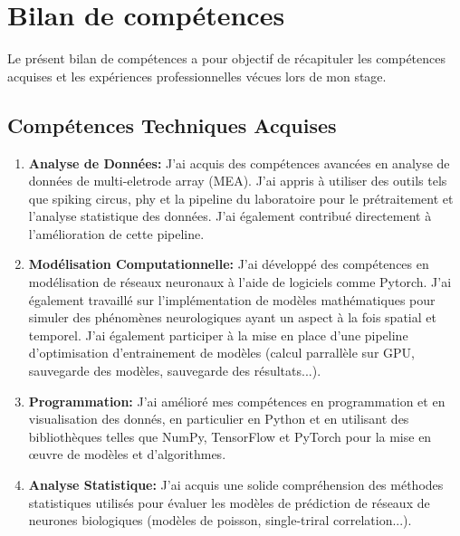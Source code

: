 \section{Bilan de compétences}\label{app:bilan_competences}

Le présent bilan de compétences a pour objectif de récapituler les compétences
acquises et les expériences professionnelles vécues lors de mon stage.

\subsection{Compétences Techniques Acquises}

\begin{enumerate}
      \item \textbf{Analyse de Données:} J'ai acquis des compétences avancées
            en
            analyse de données de multi-eletrode array (MEA). J'ai appris à
            utiliser des outils tels que
            spiking circus, phy et la pipeline du laboratoire pour le
            prétraitement et l'analyse statistique des
            données. J'ai également contribué directement à l'amélioration de
            cette pipeline.

      \item \textbf{Modélisation Computationnelle:} J'ai développé des
            compétences en modélisation de réseaux neuronaux à l'aide de
            logiciels comme Pytorch.
            J'ai également
            travaillé sur l'implémentation de modèles mathématiques pour
            simuler
            des phénomènes neurologiques ayant un aspect à la fois spatial et
            temporel.
            J'ai également participer à la mise en place d'une pipeline
            d'optimisation d'entrainement de modèles
            (calcul parrallèle sur GPU, sauvegarde des modèles, sauvegarde des
            résultats...).

      \item \textbf{Programmation:} J'ai amélioré mes compétences en
            programmation et en visualisation des donnés, en particulier en
            Python et en utilisant des
            bibliothèques
            telles que NumPy, TensorFlow et PyTorch pour la mise en œuvre de
            modèles et d'algorithmes.

      \item \textbf{Analyse Statistique:} J'ai acquis une solide compréhension
            des méthodes statistiques utilisés pour évaluer les modèles de
            prédiction
            de réseaux de neurones biologiques (modèles de poisson, single-triral
            correlation...).


\end{enumerate}
